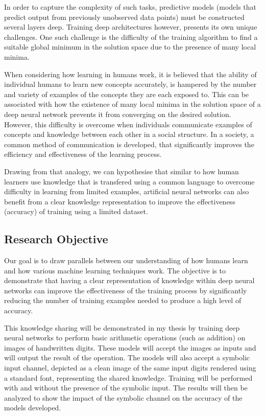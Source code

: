\documentclass{article}
\begin{document}
	In order to capture the complexity of such tasks, predictive models (models that predict output from previously unobserved data points) must be constructed several layers deep. Training deep architectures however, presents its own unique challenges. One such challenge is the difficulty of the training algorithm to find a suitable global minimum in the solution space due to the presence of many local minima\cite{Larochelle:2009:EST:1577069.1577070}.
	
	When considering how learning in humans work, it is believed that the ability of individual humans to learn new concepts accurately, is hampered by the number and variety of examples of the concepts they are each exposed to\cite{DBLP:journals/corr/abs-1203-2990}. This can be associated with how the existence of many local minima in the solution space of a deep neural network prevents it from converging on the desired solution. However, this difficulty is overcome when individuals communicate examples of concepts and knowledge between each other in a social structure\cite{DBLP:journals/corr/abs-1203-2990}. In a society, a common method of communication is developed, that significantly improves the efficiency and effectiveness of the learning process.
	
	Drawing from that analogy, we can hypothesise that similar to how human learners use knowledge that is transfered using a common language to overcome difficulty in learning from limited examples, artificial neural networks can also benefit from a clear knowledge representation to improve the effectiveness (accuracy) of training using a limited dataset.
	
	\subsection{Research Objective}
	
	Our goal is to draw parallels between our understanding of how humans learn and how various machine learning techniques work. The objective is to demonstrate that having a clear representation of knowledge within deep neural networks can improve the effectiveness of the training process by significantly reducing the number of training examples needed to produce a high level of accuracy.
	
	This knowledge sharing will be demonstrated in my thesis by training deep neural networks to perform basic arithmetic operations (such as addition) on images of handwritten digits. These models will accept the images as inputs and will output the result of the operation. The models will also accept a symbolic input channel, depicted as a clean image of the same input digits rendered using a standard font, representing the shared knowledge. Training will be performed with and without the presence of the symbolic input. The results will then be analyzed to show the impact of the symbolic channel on the accuracy of the models developed.
	
\end{document}
